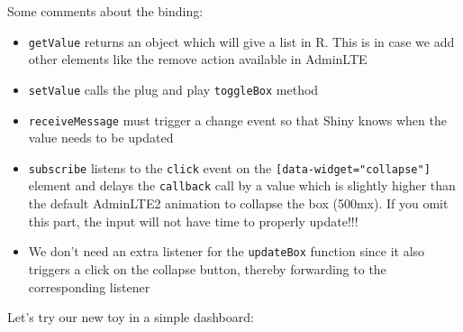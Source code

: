 \documentclass[
]{book}
\newenvironment{Shaded}{\begin{snugshade}}{\end{snugshade}}
\newcommand{\AttributeTok}[1]{\textcolor[rgb]{0.77,0.63,0.00}{#1}}
\newcommand{\DataTypeTok}[1]{\textcolor[rgb]{0.13,0.29,0.53}{#1}}
\newcommand{\DecValTok}[1]{\textcolor[rgb]{0.00,0.00,0.81}{#1}}
\newcommand{\KeywordTok}[1]{\textcolor[rgb]{0.13,0.29,0.53}{\textbf{#1}}}
\newcommand{\NormalTok}[1]{#1}
\newcommand{\OperatorTok}[1]{\textcolor[rgb]{0.81,0.36,0.00}{\textbf{#1}}}
\newcommand{\StringTok}[1]{\textcolor[rgb]{0.31,0.60,0.02}{#1}}
\newcommand{\VariableTok}[1]{\textcolor[rgb]{0.00,0.00,0.00}{#1}}
\providecommand{\tightlist}{%
  \setlength{\itemsep}{0pt}\setlength{\parskip}{0pt}}
\begin{document}
\begin{Shaded}
\end{Shaded}

Some comments about the binding:

\begin{itemize}
\tightlist
\item
  \texttt{getValue} returns an object which will give a list in R. This is in case we add other elements like the remove action available in AdminLTE
\item
  \texttt{setValue} calls the plug and play \texttt{toggleBox} method
\item
  \texttt{receiveMessage} must trigger a change event so that Shiny knows when the value needs to be updated
\item
  \texttt{subscribe} listens to the \texttt{click} event on the \texttt{{[}data-widget="collapse"{]}} element and delays the \texttt{callback} call by a value which is slightly higher than the default AdminLTE2 animation to collapse the box (500mx). If you omit this part, the input will not have time to properly update!!!
\item
  We don't need an extra listener for the \texttt{updateBox} function since it also triggers a click on the collapse button, thereby forwarding to the corresponding listener
\end{itemize}

Let's try our new toy in a simple dashboard:
\end{document}
